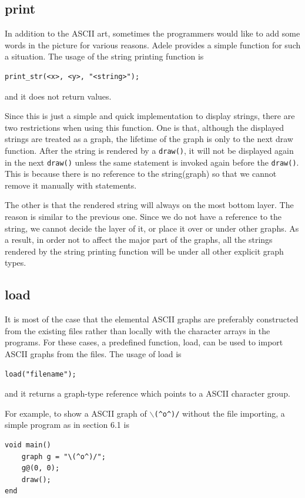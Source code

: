 \documentclass[11pt,letterpaper]{article}
\begin{document}
\subsection {print}
In addition to the ASCII art, sometimes the programmers would like to add some words in the picture for various reasons. Adele provides a simple function for such a situation. The usage of the string printing function is
\begin{lstlisting}[tabsize=4]
	print_str(<x>, <y>, "<string>");
\end{lstlisting}
and it does not return values.

Since this is just a simple and quick implementation to display strings, there are two restrictions when using this function. One is that, although the displayed strings are treated as a graph, the lifetime of the graph is only to the next draw function. After the string is rendered by a \texttt{draw()}, it will not be displayed again in the next \texttt{draw()} unless the same statement is invoked again before the \texttt{draw()}. This is because there is no reference to the string(graph) so that we cannot remove it manually with statements.

The other is that the rendered string will always on the most bottom layer. The reason is similar to the previous one. Since we do not have a reference to the string, we cannot decide the layer of it, or place it over or under other graphs. As a result, in order not to affect the major part of the graphs, all the strings rendered by the string printing function will be under all other explicit graph types.

\subsection {load}
It is most of the case that the elemental ASCII graphs are preferably constructed from the existing files rather than locally with the character arrays in the programs. For these cases, a predefined function, load, can be used to import ASCII graphs from the files. The usage of load is
\begin{lstlisting}[tabsize=4]
	load("filename");
\end{lstlisting}
and it returns a graph-type reference which points to a ASCII character group.

For example, to show a ASCII graph of \texttt{$\backslash$(\^{}o\^{})/} without the file importing, a simple program as in section 6.1 is
\begin{lstlisting}[caption=hail.adl, label=hail, captionpos=b, tabsize=4, frame=single]
void main()
	graph g = "\(^o^)/";
	g@(0, 0);
	draw();
end
\end{lstlisting}
\end{document}
